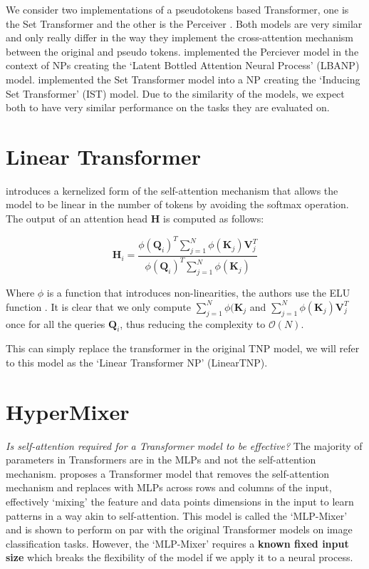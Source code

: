 \documentclass[../../main.tex]{subfiles}
\begin{document}
We consider two implementations of a pseudotokens based Transformer, one is the Set Transformer \cite{lee2019set} and the other is the Perceiver \cite{jaegle2021perceiver}. Both models are very similar and only really differ in the way they implement the cross-attention mechanism between the original and pseudo tokens. \cite{feng2023latent} implemented the Perciever model in the context of NPs creating the `Latent Bottled Attention Neural Process' (LBANP) model. \cite{anonymous2024translationequivariant} implemented the Set Transformer model into a NP creating the `Inducing Set Transformer' (IST) model. Due to the similarity of the models, we expect both to have very similar performance on the tasks they are evaluated on.


\section{Linear Transformer}

\cite{katharopoulos2020transformers} introduces a kernelized form of the self-attention mechanism that allows the model to be linear in the number of tokens by avoiding the softmax operation. The output of an attention head $\bm{H}$ is computed as follows:

\begin{equation}
    \bm{H}_i = \frac{\phi(\bm{Q}_i)^T \sum_{j=1}^{N} \phi(\bm{K}_j) \bm{V}_j^T}{\phi(\bm{Q}_i)^T \sum_{j=1}^{N} \phi(\bm{K}_j)}
\end{equation}

Where $\phi$ is a function that introduces non-linearities, the authors use the ELU function \cite{clevert2016fast}. It is clear that we only compute $\sum_{j=1}^{N} \phi(\bm{K}_j$ and $\sum_{j=1}^{N} \phi(\bm{K}_j) \bm{V}_j^T$ once for all the queries $\bm{Q}_i$, thus reducing the complexity to $\mathcal{O}(N)$.

This can simply replace the transformer in the original TNP model, we will refer to this model as the `Linear Transformer NP' (LinearTNP).


\section{HyperMixer}

\emph{Is self-attention required for a Transformer model to be effective?} The majority of parameters in Transformers are in the MLPs and not the self-attention mechanism. \cite{tolstikhin2021mlpmixer} proposes a Transformer model that removes the self-attention mechanism and replaces with MLPs across rows and columns of the input, effectively `mixing' the feature and data points dimensions in the input to learn patterns in a way akin to self-attention. This model is called the `MLP-Mixer' and is shown to perform on par with the original Transformer models on image classification tasks. However, the `MLP-Mixer' requires a \textbf{known fixed input size} which breaks the flexibility of the model if we apply it to a neural process.
\end{document}
